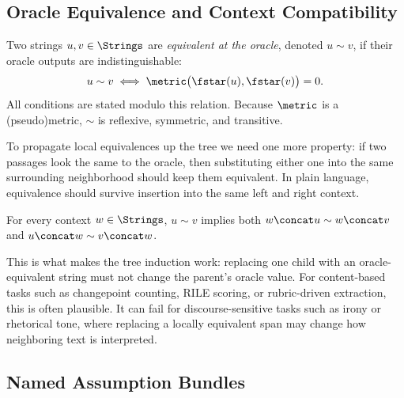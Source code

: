 \subsection{Oracle Equivalence and Context Compatibility}

Two strings $u, v \in \Strings$ are \emph{equivalent at the oracle}, denoted $u \sim v$, if their oracle outputs are indistinguishable:
\[
u \sim v \;\Longleftrightarrow\; \metric\big(\fstar(u), \fstar(v)\big) = 0.
\]
All conditions are stated modulo this relation. Because $\metric$ is a (pseudo)metric, $\sim$ is reflexive, symmetric, and transitive.

To propagate local equivalences up the tree we need one more property: if two passages look the same to the oracle, then substituting either one into the same surrounding neighborhood should keep them equivalent. In plain language, equivalence should survive insertion into the same left and right context.

\begin{assumption}\label{ass:context}
For every context $w \in \Strings$, $u \sim v$ implies both $w \concat u \sim w \concat v$ and $u \concat w \sim v \concat w$.
\end{assumption}

This is what makes the tree induction work: replacing one child with an oracle-equivalent string must not change the parent's oracle value. For content-based tasks such as changepoint counting, RILE scoring, or rubric-driven extraction, this is often plausible. It can fail for discourse-sensitive tasks such as irony or rhetorical tone, where replacing a locally equivalent span may change how neighboring text is interpreted.

\subsection{Named Assumption Bundles}

